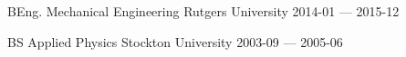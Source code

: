 


\begin{cventries}

  \cventry
    {BEng. Mechanical Engineering} %
    {Rutgers University} %
    {} %
    {2014-01 — 2015-12} %
    {}


  \cventry
    {BS Applied Physics} %
    {Stockton University} %
    {} %
    {2003-09 — 2005-06} %
    {}


\end{cventries}

